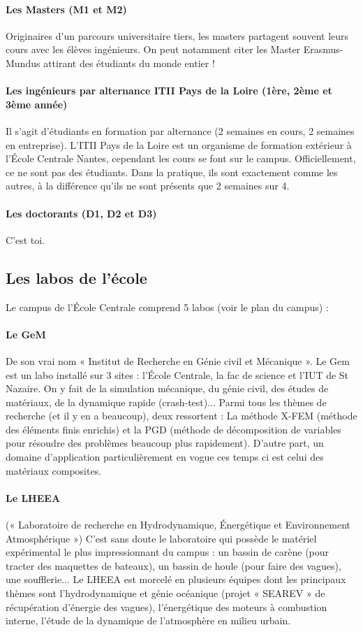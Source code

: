 \paragraph{Les Masters (M1 et M2)} Originaires d'un parcours universitaire tiers, les masters partagent souvent leurs cours avec les élèves ingénieurs. On peut notamment citer les Master Erasmus-Mundus attirant des étudiants du monde entier !
\paragraph{Les ingénieurs par alternance ITII Pays de la Loire (1ère, 2ème et 3ème année)} Il s'agit d'étudiants en formation par alternance (2 semaines en cours, 2 semaines en entreprise). L'ITII Pays de la Loire est un organisme de formation extérieur à l'École Centrale Nantes, cependant les cours se font sur le campus. Officiellement, ce ne sont pas des étudiants. Dans la pratique, ils sont exactement comme les autres, à la différence qu'ils ne sont présents que 2 semaines sur 4.
\paragraph{Les doctorants (D1, D2 et D3)} C'est toi.

\subsection{Les labos de l'école}\trad
Le campus de l'École Centrale comprend 5 labos (voir le plan du campus) :
\paragraph{Le GeM} De son vrai nom « Institut de Recherche en Génie civil et Mécanique ». Le Gem est un labo installé sur 3 sites : l'École Centrale, la fac de science et l'IUT de St Nazaire. On y fait de la simulation mécanique, du génie civil, des études de matériaux, de la dynamique rapide (crash-test)... Parmi tous les thèmes de recherche (et il y en a beaucoup), deux ressortent : La méthode X-FEM (méthode des éléments finis enrichis) et la PGD (méthode de décomposition de variables pour résoudre des problèmes beaucoup plus rapidement). D'autre part, un domaine d'application particulièrement en vogue ces temps ci est celui des matériaux composites.
\paragraph{Le LHEEA} (« Laboratoire de recherche en Hydrodynamique, Énergétique et Environnement Atmosphérique ») C'est sans doute le laboratoire qui possède le matériel expérimental le plus impressionnant du campus : un bassin de carène (pour tracter des maquettes de bateaux), un bassin de houle (pour faire des vagues), une soufflerie... Le LHEEA est morcelé en plusieurs équipes dont les principaux thèmes sont l'hydrodynamique et génie océanique (projet « SEAREV » de récupération d'énergie des vagues), l'énergétique des moteurs à combustion interne, l'étude de la dynamique de l'atmosphère en milieu urbain.
